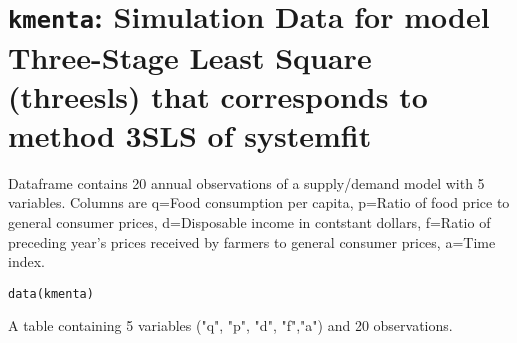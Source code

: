  \section{{\tt kmenta}: Simulation Data for model Three-Stage Least Square (threesls) that corresponds to method 3SLS of systemfit}\label{ss:kmenta}
\begin{Description}\relax
Dataframe contains 20 annual observations of a supply/demand model
with 5 variables. Columns are q=Food consumption per capita,
p=Ratio of food price to general consumer prices, 
d=Disposable income in contstant dollars,
f=Ratio of preceding year's prices received by farmers to general consumer prices,
a=Time index.
\end{Description}
\begin{Usage}
\begin{verbatim}data(kmenta)\end{verbatim}
\end{Usage}
\begin{Format}\relax
A table containing 5 variables ("q", "p", "d", "f","a")
and 20 observations.
\end{Format}


